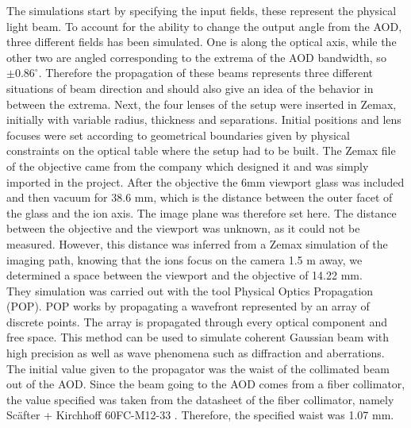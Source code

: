 The simulations start by specifying the input fields, these represent the physical light beam. To account for the ability to change the output angle from the AOD, three different fields has been simulated. One is along the optical axis, while the other two are angled corresponding to the extrema of the AOD bandwidth, so $\pm0.86^{\circ}$. Therefore the propagation of these beams represents three different situations of beam direction and should also give an idea of the behavior in between the extrema. Next, the four lenses of the setup were inserted in Zemax, initially with variable radius, thickness and separations. Initial positions and lens focuses were set according to geometrical boundaries given by physical constraints on the optical table where the setup had to be built. The Zemax file of the objective came from the company which designed it and was simply imported in the project. After the objective the 6mm viewport glass was included and then vacuum for 38.6 mm, which is the distance between the outer facet of the glass and the ion axis. The image plane was therefore set here. The distance between the objective and the viewport was unknown, as it could not be measured. However, this distance was inferred from a Zemax simulation of the imaging path, knowing that the ions focus on the camera 1.5 m away, we determined a space between the viewport and the objective of 14.22 mm.\\
They simulation was carried out with the tool Physical Optics Propagation (POP). POP works by propagating a wavefront represented by an array of discrete points. The array is propagated through every optical component and free space. This method can be used to simulate coherent Gaussian beam with high precision as well as wave phenomena such as diffraction and aberrations. The initial value given to the propagator was the waist of the collimated beam out of the AOD. Since the beam going to the AOD comes from a fiber collimator, the value specified was taken from the datasheet of the fiber collimator, namely Sc\"after + Kirchhoff 60FC-M12-33 \cite{fibercollimator}. Therefore, the specified waist was 1.07 mm.
